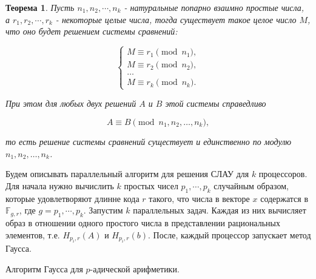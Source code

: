 \documentclass[master, och, diploma, times]{sty/SCWorks}
\theoremstyle{plain}
\newtheorem{thethm}{Теорема}[section]
\theoremstyle{definition}
\begin{document}
\begin{thethm}
Пусть $n_1,n_2,\cdots, n_k$ - натуральные попарно взаимно простые числа, а $r_1,r_2,\cdots,r_k$ - некоторые целые числа, тогда существует такое целое число $M$, что оно будет решением системы сравнений:

$$
\begin{cases} 
M \equiv r_1 \pmod {n_1}, \\
M \equiv r_2 \pmod {n_2}, \\
\dots \\
M \equiv r_k \pmod {n_k}.
\end{cases}
$$

\noindent При этом для любых двух решений $A$ и $B$ этой системы справедливо

$$
A \equiv B \pmod {n_1,n_2,\dots,n_k},
$$

\noindent то есть решение системы сравнений существует и единственно по модулю $n_1,n_2,\dots,n_k$.
\end{thethm}


Будем описывать параллельный алгоритм для решения СЛАУ для $k$ процессоров. Для начала нужно вычислить $k$ простых чисел $p_1, \cdots, p_k$ случайным образом, которые удовлетворяют длинне кода $r$ такого, что числа в векторе $x$ содержатся в $\mathbb{F}_{g,r}$, где $g=p_1,\cdots,p_k$. 
Запустим $k$ параллельных задач. Каждая из них вычисляет образ в отношении одного простого числа в представлении рациональных элементов, т.е. $H_{p_i,r}(A)$ и $H_{p_i,r}(b)$.
После, каждый процессор запускает метод Гаусса.

\begin{algorithm}
\DontPrintSemicolon %





\caption{Алгоритм Гаусса для $p$-адической арифметики.}
\label{algo:gauss}
\end{algorithm}
\end{document}
